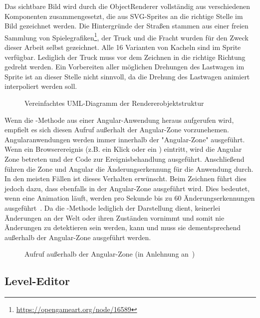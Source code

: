 Das sichtbare Bild wird durch die ObjectRenderer vollständig aus verschiedenen Komponenten zusammengesetzt, die aus SVG-Sprites an die richtige Stelle im Bild gezeichnet werden. Die Hintergründe der Straßen stammen aus einer freien Sammlung von Spielegrafiken\footnote{\url{https://opengameart.org/node/16589}}, der Truck und die Fracht wurden für den Zweck dieser Arbeit selbst gezeichnet. Alle 16 Varianten von Kacheln sind im Sprite verfügbar. Lediglich der Truck muss vor dem Zeichnen in die richtige Richtung gedreht werden. Ein Vorbereiten aller möglichen Drehungen des Lastwagen im Sprite ist an dieser Stelle nicht sinnvoll, da die Drehung des Lastwagen animiert interpoliert werden soll.

\begin{figure}
  
  \caption{Vereinfachtes UML-Diagramm der Rendererobjektstruktur}
  \label{sec:implementation:rendering:structure:uml}
\end{figure}

Wenn die -Methode aus einer Angular-Anwendung heraus aufgerufen wird, empfielt es sich diesen Aufruf außerhalt der Angular-Zone vorzunehemen. Angularanwendungen werden immer innerhalb der "Angular-Zone" ausgeführt. Wenn ein Browserereignis (z.B. ein Klick oder ein ) eintritt, wird die Angular Zone betreten und der Code zur Ereignisbehandlung ausgeführt. Anschließend führen die Zone und Angular die Änderungserkennung für die Anwendung durch. In den meisten Fällen ist dieses Verhalten erwünscht. Beim Zeichnen führt dies jedoch dazu, dass  ebenfalls in der Angular-Zone ausgeführt wird. Dies bedeutet, wenn eine Animation läuft, werden pro Sekunde bis zu 60 Änderungserkennungen ausgeführt~\cite{angular-canvas}. Da die -Methode lediglich der Darstellung dient, keinerlei Änderungen an der Welt oder ihren Zuständen vornimmt und somit nie Änderungen zu detektieren sein werden, kann und muss sie dementsprechend außerhalb der Angular-Zone ausgeführt werden.

\begin{figure}
  
  \caption{Aufruf außerhalb der Angular-Zone (in Anlehnung an~\cite{angular-canvas})}
  \label{sec:implementation:rendering:structure:ngzone}
\end{figure}

\subsection{Level-Editor}
\label{sec:implementation:program:level-editor}

